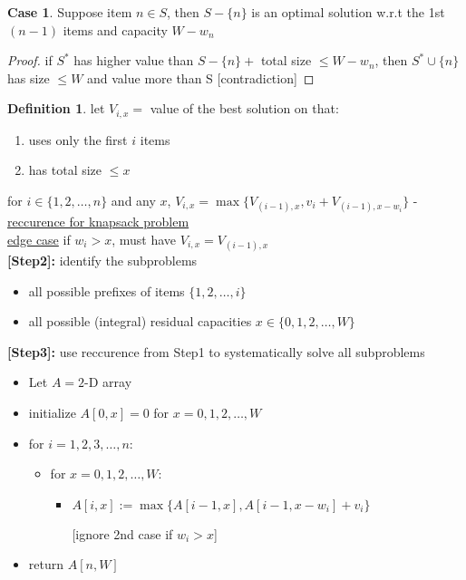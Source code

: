 \documentclass[a4paper,12pt]{article}
\theoremstyle{plain}
\theoremstyle{definition}
\newtheorem*{definition}{Definition}
\newtheorem{case}{Case}[subsection]
\theoremstyle{remark}
\begin{document}
\begin{case}
Suppose item $n \in S$, then $S-\{n\}$ is an optimal solution w.r.t the 1st $(n-1)$ items and capacity $W - w_n$

\begin{proof} if $S^*$ has higher value than $S-\{n\} +$ total size $\leq W - w_n$, then $S^* \cup\{n\}$ has size $\leq W$ and value more than S [contradiction]\end{proof}
\end{case}

\begin{definition}let $V_{i,x} =$ value of the best solution on that:
\begin{enumerate}
	\item uses only the first $i$ items
	\item has total size $\leq x$
\end{enumerate}
\end{definition}

for $i \in \{1, 2, \dots, n\}$ and any $x$, $V_{i,x} = \max \{V_{(i-1),x}, v_i + V_{(i-1), x-w_i}\}$ - \underline{reccurence for knapsack problem}
\\

\underline{edge case} if $w_i > x$, must have $V_{i,x} = V_{(i-1),x}$
\\

\textbf{[Step2]:} identify the subproblems
\begin{itemize}
	\item all possible prefixes of items $\{1, 2, \dots, i\}$
	\item all possible (integral) residual capacities $x \in \{0, 1, 2, \dots, W\}$
\end{itemize}

\textbf{[Step3]:} use reccurence from Step1 to systematically solve all subproblems
\begin{itemize}
	\item Let $A = 2$-D array
	\item initialize $A[0, x] = 0$ for $x = 0, 1, 2, \dots, W$
	\item for $i = 1, 2, 3, \dots, n$:
	\begin{itemize}
		\item for $x = 0, 1, 2, \dots, W$:
		\begin{itemize}
			\item $A[i, x] := \max \{A[i-1, x], A[i-1, x-w_i] + v_i\}$

			[ignore 2nd case if $w_i > x$]
		\end{itemize}
	\end{itemize}
	\item return $A[n, W]$
\end{itemize}
\end{document}
